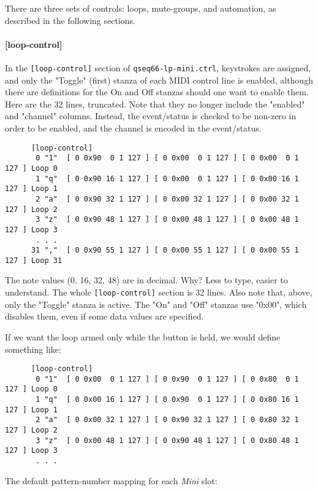    There are three sets of controls:  loops, mute-groups, and automation, as
   described in the following sections.

\paragraph{[loop-control]}
\label{paragraph:patterns_loop_control}

   In the \texttt{[loop-control]} section of \texttt{qseq66-lp-mini.ctrl},
   keystrokes are assigned, and only the "Toggle" (first)
   stanza of each MIDI control line
   is enabled, although there are definitions for the On and Off stanzas
   should one want to enable them.  Here are the 32 lines, truncated.
   Note that they no longer include the "enabled" and "channel" columns.
   Instead, the event/status is checked to be non-zero in order to be enabled,
   and the channel is encoded in the event/status.

   \begin{verbatim}
      [loop-control]
       0 "1"  [ 0 0x90  0 1 127 ] [ 0 0x00  0 1 127 ] [ 0 0x00  0 1 127 ] Loop 0
       1 "q"  [ 0 0x90 16 1 127 ] [ 0 0x00  0 1 127 ] [ 0 0x00 16 1 127 ] Loop 1
       2 "a"  [ 0 0x90 32 1 127 ] [ 0 0x00 32 1 127 ] [ 0 0x00 32 1 127 ] Loop 2
       3 "z"  [ 0 0x90 48 1 127 ] [ 0 0x00 48 1 127 ] [ 0 0x00 48 1 127 ] Loop 3
       . . .
      31 ","  [ 0 0x90 55 1 127 ] [ 0 0x00 55 1 127 ] [ 0 0x00 55 1 127 ] Loop 31
   \end{verbatim}

   The note values (0, 16, 32, 48) are in decimal. Why?
   Less to type, easier to understand.
   The whole \texttt{[loop-control]} section is 32 lines.
   Also note that, above, only the "Toggle" stanza is active.
   The "On" and "Off" stanzas use "0x00", which disables them, even
   if some data values are specified.

   If we want the loop armed only while the button is held, we would
   define something like:

   \begin{verbatim}
      [loop-control]
       0 "1"  [ 0 0x00  0 1 127 ] [ 0 0x90  0 1 127 ] [ 0 0x80  0 1 127 ] Loop 0
       1 "q"  [ 0 0x00 16 1 127 ] [ 0 0x90  0 1 127 ] [ 0 0x80 16 1 127 ] Loop 1
       2 "a"  [ 0 0x00 32 1 127 ] [ 0 0x90 32 1 127 ] [ 0 0x80 32 1 127 ] Loop 2
       3 "z"  [ 0 0x00 48 1 127 ] [ 0 0x90 48 1 127 ] [ 0 0x80 48 1 127 ] Loop 3
       . . .
   \end{verbatim}

   The default pattern-number mapping for each \textsl{Mini} slot:

